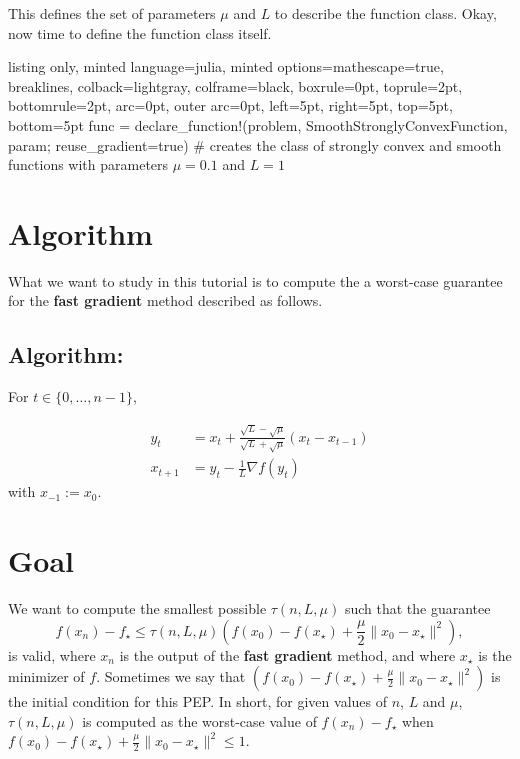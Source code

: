 \documentclass{article}
\begin{document}
This defines the set of parameters $\mu$ and $L$ to describe the function class. Okay, now time to define the function class itself.  

\begin{tcblisting}{listing only, minted language=julia, minted options={mathescape=true, breaklines}, colback=lightgray, colframe=black, boxrule=0pt, toprule=2pt, bottomrule=2pt, arc=0pt, outer arc=0pt, left=5pt, right=5pt, top=5pt, bottom=5pt}
func = declare_function!(problem, SmoothStronglyConvexFunction, param; reuse_gradient=true) # creates the class of strongly convex and smooth functions with parameters $\mu = 0.1$ and $L=1$
\end{tcblisting}


\section{Algorithm}

What we want to study in this tutorial is to compute the a worst-case guarantee for the  \textbf{fast gradient} method described as follows. 

\subsection{Algorithm:}
For $t \in \{0, \dots, n-1\}$,


\begin{equation*}
\begin{aligned}
    y_t & = x_t + \frac{\sqrt{L} - \sqrt{\mu}}{\sqrt{L} + \sqrt{\mu}}(x_t - x_{t-1}) \\
    x_{t+1} & = y_t - \frac{1}{L} \nabla f(y_t)
\end{aligned}
\end{equation*}
with $x_{-1}:= x_0$.

\section{Goal}

We want to compute the smallest possible $\tau(n, L, \mu)$ such that the guarantee
\begin{equation*}
f(x_n) - f_\star \leqslant \tau(n, L, \mu) \left(f(x_0) -  f(x_\star) + \frac{\mu}{2}\|x_0 - x_\star\|^2\right),
\end{equation*}
is valid, where $x_n$ is the output of the \textbf{fast gradient} method, and where $x_\star$ is the minimizer of $f$. Sometimes we say that $\left(f(x_0) -  f(x_\star) + \frac{\mu}{2}\|x_0 - x_\star\|^2\right)$ is the initial condition for this PEP. In short, for given values of $n$, $L$ and $\mu$,
$\tau(n, L, \mu)$ is computed as the worst-case value of
$f(x_n)-f_\star$ when $f(x_0) -  f(x_\star) + \frac{\mu}{2}\|x_0 - x_\star\|^2 \leqslant 1$.
\end{document}
